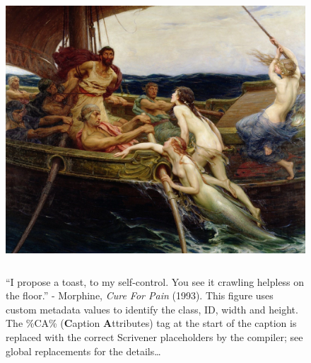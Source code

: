 \documentclass[
  12pt,
  a4paper,
  oneside,
  numbers=noenddot,
  titlepage,
  toclink=all,
  toc=bibliography]{scrbook}
\theoremstyle{definition}
\theoremstyle{definition}
\theoremstyle{definition}
\theoremstyle{plain}
\theoremstyle{plain}
\theoremstyle{plain}
\theoremstyle{plain}
\theoremstyle{plain}
\theoremstyle{remark}
\begin{document}
\begin{figure}

{\centering \includegraphics[width=5.0625in,height=4.1875in]{Ulysses1.jpg}

}

\caption{\label{fig-scriv22}\enquote{I propose a toast, to my
self-control. You see it crawling helpless on the floor.} - Morphine,
\emph{Cure For Pain} (1993). This figure uses custom metadata values to
identify the class, ID, width and height. The \%CA\%\hspace{0pt}
(\textbf{C}aption \textbf{A}ttributes) tag at the start of the caption
is replaced with the correct Scrivener placeholders by the compiler; see
global replacements for the details\ldots{}}

\end{figure}
\end{document}
